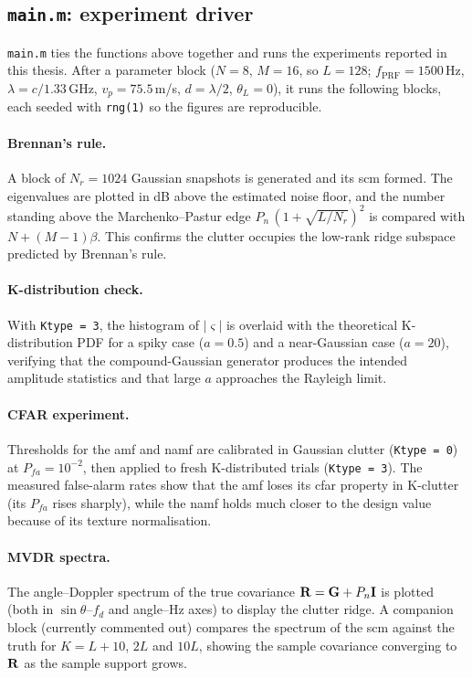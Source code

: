 \documentclass{article}
\begin{document}
\subsection{\texttt{main.m}: experiment driver}\label{sec:code:main}

\texttt{main.m} ties the functions above together and runs the experiments reported in this thesis. After a parameter block ($N=8$, $M=16$, so $L=128$; $f_\mathrm{PRF}=1500$\,Hz, $\lambda=c/1.33\,\mathrm{GHz}$, $v_p=75.5$\,m/s, $d=\lambda/2$, $\theta_L=0$), it runs the following blocks, each seeded with \texttt{rng(1)} so the figures are reproducible.

\paragraph{Brennan's rule.} A block of $N_r=1024$ Gaussian snapshots is generated and its \gls{scm} formed. The eigenvalues are plotted in dB above the estimated noise floor, and the number standing above the Marchenko--Pastur edge $\hat P_n\,(1+\sqrt{L/N_r})^2$ is compared with $N+(M-1)\beta$. This confirms the clutter occupies the low-rank ridge subspace predicted by Brennan's rule.

\paragraph{K-distribution check.} With \texttt{Ktype = 3}, the histogram of $|\varsigma|$ is overlaid with the theoretical K-distribution PDF for a spiky case ($a=0.5$) and a near-Gaussian case ($a=20$), verifying that the compound-Gaussian generator produces the intended amplitude statistics and that large $a$ approaches the Rayleigh limit.

\paragraph{CFAR experiment.} Thresholds for the \gls{amf} and \gls{namf} are calibrated in Gaussian clutter (\texttt{Ktype = 0}) at $P_{fa}=10^{-2}$, then applied to fresh K-distributed trials (\texttt{Ktype = 3}). The measured false-alarm rates show that the \gls{amf} loses its \gls{cfar} property in K-clutter (its $P_{fa}$ rises sharply), while the \gls{namf} holds much closer to the design value because of its texture normalisation.

\paragraph{MVDR spectra.} The angle--Doppler spectrum of the true covariance $\mathbf{R}=\mathbf{G}+P_n\mathbf{I}$ is plotted (both in $\sin\theta$--$f_d$ and angle--Hz axes) to display the clutter ridge. A companion block (currently commented out) compares the spectrum of the \gls{scm} against the truth for $K=L+10$, $2L$ and $10L$, showing the sample covariance converging to $\mathbf{R}$ as the sample support grows.
\end{document}
